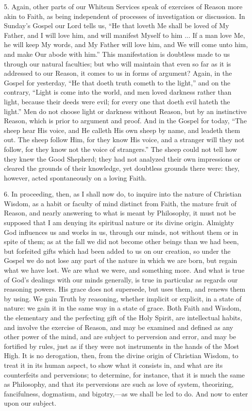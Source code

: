 5. Again, other parts of our Whitsun Services speak of exercises of
Reason more akin to Faith, as being independent of processes of
investigation or discussion. In Sunday's Gospel our Lord tells us,
``He that loveth Me shall be loved of My Father, and I will love
him, and will manifest Myself to him ... If a man love Me, he will
keep My words, and My Father will love him, and We will come unto him,
and make Our abode with him.'' This manifestation is doubtless
made to us through our natural faculties; but who will maintain that
even so far as it is addressed to our Reason, it comes to us in forms
of argument? Again, in the Gospel for yesterday, ``He that doeth
truth cometh to the light,'' and on the contrary, ``Light is
come into the world, and men loved darkness rather than light, because
their deeds were evil; for every one that doeth evil hateth the
light.'' Men do not choose light or darkness without Reason, but
by an instinctive Reason, which is prior to argument and proof. And in
the Gospel for today, ``The sheep hear His voice, and He calleth
His own sheep by name, and leadeth them out. The sheep follow Him, for
they know His voice, and a stranger will they not follow, for they
know not the voice of strangers.'' The sheep could not tell how
they knew the Good Shepherd; they had not analyzed their own
impressions or cleared the grounds of their knowledge, yet doubtless
grounds there were: they, however, acted spontaneously on a loving
Faith.

6. In proceeding, then, as I shall now do, to inquire into the
nature of Christian Wisdom, as a habit or faculty of mind distinct
from Faith, the mature fruit of Reason, and nearly answering to what
is meant by Philosophy, it must not be supposed that I am denying its
spiritual nature or its divine origin. Almighty God influences us and
works in us, through our minds, not without them or in spite of them;
as at the fall we did not become other beings than we had been, but
forfeited gifts which had been added to us on our creation, so under
the Gospel we do not lose any part of the nature in which we are born,
but regain what we have lost. We are what we were, and something more.
And what is true of God's dealings with our minds generally, is true
in particular as regards our reasoning powers. His grace does not
supersede, but uses them, and renews them by using. We gain Truth by
reasoning, whether implicit or explicit, in a state of nature: we gain
it in the same way in a state of grace. Both Faith and Wisdom, the
elementary and the perfecting gift of the Holy Spirit, are
intellectual habits, and involve the exercise of Reason, and may be
examined and defined as any other power of the mind, and are subject
to perversion and error, and may be fortified by rules, just as if
they were not instruments in the hands of the Most High. It is no
derogation, then, from the divine origin of Christian Wisdom, to treat
it in its human aspect, to show what it consists in, and what are its
counterfeits and perversions; to determine, for instance, that it is
much the same as Philosophy, and that its perversions are such as love
of system, theorizing, fancifulness, dogmatism, and bigotry,—as we
shall be led to do. And now to enter upon our subject.

